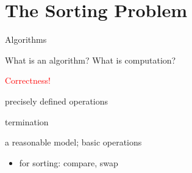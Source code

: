 \section{The Sorting Problem}

\begin{frame}{Algorithms}
  \begin{center}
	What is an algorithm? \qquad \pause What is computation?
  \end{center}

  \pause


  \pause
  \vspace{-0.60cm}
  \begin{center}
	\textcolor{red}{Correctness!}
  \end{center}

  \pause

  \begin{description}[Effectiveness:]
	\item[Definiteness:] precisely defined operations
	  \pause
	\item[Finiteness:] termination
	  \pause
	\item[Effectiveness:] a reasonable model; basic operations %
	  \pause
	  \begin{itemize}
		\item for sorting: compare, swap
	  \end{itemize}
  \end{description}
\end{frame}
